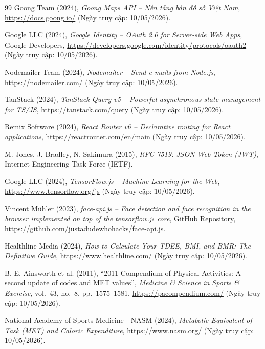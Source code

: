 \begin{thebibliography}{99}
Goong Team (2024), \textit{Goong Maps API -- Nền tảng bản đồ số Việt Nam}, \url{https://docs.goong.io/} (Ngày truy cập: 10/05/2026).

Google LLC (2024), \textit{Google Identity -- OAuth 2.0 for Server-side Web Apps}, Google Developers, \url{https://developers.google.com/identity/protocols/oauth2} (Ngày truy cập: 10/05/2026).

Nodemailer Team (2024), \textit{Nodemailer -- Send e-mails from Node.js}, \url{https://nodemailer.com/} (Ngày truy cập: 10/05/2026).

TanStack (2024), \textit{TanStack Query v5 -- Powerful asynchronous state management for TS/JS}, \url{https://tanstack.com/query} (Ngày truy cập: 10/05/2026).

Remix Software (2024), \textit{React Router v6 -- Declarative routing for React applications}, \url{https://reactrouter.com/en/main} (Ngày truy cập: 10/05/2026).

M. Jones, J. Bradley, N. Sakimura (2015), \textit{RFC 7519: JSON Web Token (JWT)}, Internet Engineering Task Force (IETF).

Google LLC (2024), \textit{TensorFlow.js -- Machine Learning for the Web}, \url{https://www.tensorflow.org/js} (Ngày truy cập: 10/05/2026).

Vincent Mühler (2023), \textit{face-api.js -- Face detection and face recognition in the browser implemented on top of the tensorflow.js core}, GitHub Repository, \url{https://github.com/justadudewhohacks/face-api.js}.

Healthline Media (2024), \textit{How to Calculate Your TDEE, BMI, and BMR: The Definitive Guide}, \url{https://www.healthline.com/} (Ngày truy cập: 10/05/2026).

B. E. Ainsworth et al. (2011), ``2011 Compendium of Physical Activities: A second update of codes and MET values'', \textit{Medicine \& Science in Sports \& Exercise}, vol.~43, no.~8, pp.~1575--1581. \url{https://pacompendium.com/} (Ngày truy cập: 10/05/2026).

National Academy of Sports Medicine - NASM (2024), \textit{Metabolic Equivalent of Task (MET) and Caloric Expenditure}, \url{https://www.nasm.org/} (Ngày truy cập: 10/05/2026).


\end{thebibliography}
